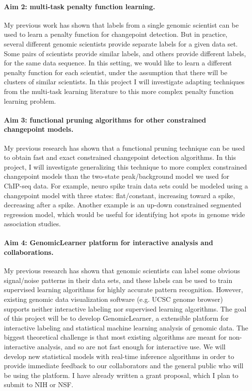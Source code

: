 \documentclass{article}
\begin{document}
\paragraph{Aim 2: multi-task penalty function learning.} My previous
work has shown that labels from a single genomic scientist can be used
to learn a penalty function for changepoint detection. But in
practice, several different genomic scientists provide separate
labels for a given data set. Some pairs of scientists provide similar
labels, and others provide different labels, for the same data
sequence. In this setting, we would like to learn a different penalty
function for each scientist, under the assumption that there will be
clusters of similar scientists. In this project I will investigate
adapting techniques from the multi-task learning literature to this
more complex penalty function learning problem.


\paragraph{Aim 3: functional pruning algorithms for other constrained
  changepoint models.} My previous research has shown that a
functional pruning technique can be used to obtain fast and exact
constrained changepoint detection algorithms. In this project, I will
investigate generalizing this technique to more complex constrained
changepoint models than the two-state peak/background model we used
for ChIP-seq data. For example, neuro spike train data sets could be
modeled using a changepoint model with three states: flat/constant,
increasing toward a spike, decreasing after a spike.  Another example
is an up-down constrained segmented regression model, which would be
useful for identifying hot spots in genome wide association studies.

\paragraph{Aim 4: GenomicLearner platform for interactive analysis and
  collaborations.} My previous research has shown that genomic
scientists can label some obvious signal/noise patterns in their data
sets, and these labels can be used to train supervised learning
algorithms for highly accurate pattern recognition. However, existing
genomic data visualization software (e.g. UCSC genome browser)
supports neither interactive labeling nor supervised learning
algorithms. The goal of this project will be to develop
GenomicLearner, a extensible platform for interactive labeling and
statistical machine learning analysis of genomic data. The biggest
theoretical challenge is that most existing algorithms are meant for
non-interactive analysis, and so are not fast enough for interactive
use. We will develop new statistical models with real-time inference
algorithms in order to provide immediate feedback to our collaborators
and the general public who will be using the platform. I have already
written a grant proposal, which I plan to submit to NIH or NSF.
\end{document}

